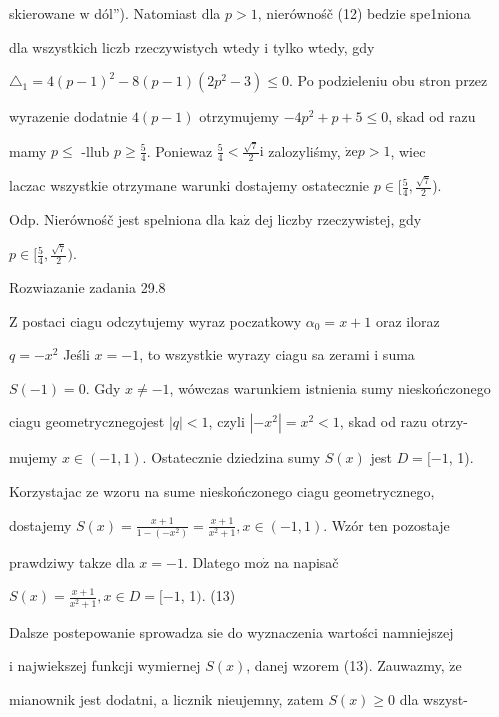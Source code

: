 \documentclass[a4paper,12pt]{article}
\begin{document}
skierowane $\mathrm{w}$ dól''). Natomiast dla $p>1$, nierównośč (12) bedzie spe1niona

dla wszystkich liczb rzeczywistych wtedy $\mathrm{i}$ tylko wtedy, gdy

$\triangle_{1} =4(p-1)^{2}-8(p-1)(2p^{2}-3) \leq 0$. Po podzieleniu obu stron przez

wyrazenie dodatnie $4(p-1)$ otrzymujemy $-4p^{2}+p+5\leq 0$, skad od razu

mamy $ p\leq$ -llub $ p\geq \displaystyle \frac{5}{4}$. Poniewaz $\displaystyle \frac{5}{4}< \displaystyle \frac{\sqrt{7}}{2}\mathrm{i}$ zalozyliśmy, $\dot{\mathrm{z}}\mathrm{e}p>1$, wiec

laczac wszystkie otrzymane warunki dostajemy ostatecznie $ p\in [\displaystyle \frac{5}{4},\frac{\sqrt{7}}{2}$).

Odp. Nierównośč jest spelniona dla $\mathrm{k}\mathrm{a}\dot{\mathrm{z}}$ dej liczby rzeczywistej, gdy

$ p\in [\displaystyle \frac{5}{4},\frac{\sqrt{7}}{2}).$

Rozwiazanie zadania 29.8

$\mathrm{Z}$ postaci ciagu odczytujemy wyraz poczatkowy $\alpha_{0}=x+1$ oraz iloraz

$q = -x^{2}$ Jeśli $x = -1$, to wszystkie wyrazy ciagu sa zerami $\mathrm{i}$ suma

$S(-1)=0$. Gdy $x\neq-1$, wówczas warunkiem istnienia sumy nieskończonego

ciagu geometrycznegojest $|q|<1$, czyli $|-x^{2}|=x^{2}<1$, skad od razu otrzy-

mujemy $x\in(-1,1)$. Ostatecznie dziedzina sumy $S(x)$ jest $D=[-1$, 1).

Korzystajac ze wzoru na sume nieskończonego ciagu geometrycznego,

dostajemy $S(x) =\displaystyle \frac{x+1}{1-(-x^{2})}=\frac{x+1}{x^{2}+1},  x\in (-1,1)$. Wzór ten pozostaje

prawdziwy takze dla $x=-1$. Dlatego $\mathrm{m}\mathrm{o}\dot{\mathrm{z}}$ na napisač

$S(x)=\displaystyle \frac{x+1}{x^{2}+1}, x\in D=[-1$, 1$)$.   (13)

Dalsze postepowanie sprowadza $\mathrm{s}\mathrm{i}\mathrm{e}$ do wyznaczenia wartości namniejszej

$\mathrm{i}$ najwiekszej funkcji wymiernej $S(x)$, danej wzorem (13). Zauwazmy, $\dot{\mathrm{z}}\mathrm{e}$

mianownik jest dodatni, a licznik nieujemny, zatem $S(x) \geq 0$ dla wszyst-
\end{document}
